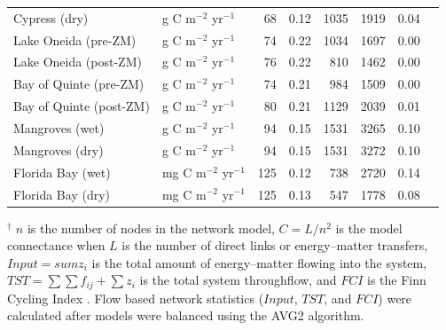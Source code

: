 \documentclass[article]{jss}
\begin{document}
\begin{table}[ht]
\begin{center}
\begin{tiny}
\begin{tabular}{llrrrrrr}
      Cypress (dry) & g C m$^{-2}$ yr$^{-1}$  &  68 & 0.12 & 1035 & 1919 & 0.04 &  \citet{ulanowicz97_cypress} \\
      Lake Oneida (pre-ZM) & g C m$^{-2}$ yr$^{-1}$  &  74 & 0.22 & 1034 & 1697 & 0.00 &  \citet{miehls09_oneida} \\
      Lake Oneida (post-ZM) & g C m$^{-2}$ yr$^{-1}$  &  76 & 0.22 & 810 & 1462 & 0.00 &  \citet{miehls09_oneida} \\
      Bay of Quinte (pre-ZM) & g C m$^{-2}$ yr$^{-1}$  &  74 & 0.21 & 984 & 1509 & 0.00 &   \citet{miehls09_quinte} \\
      Bay of Quinte (post-ZM) & g C m$^{-2}$ yr$^{-1}$  &  80 & 0.21 & 1129 & 2039 & 0.01 &   \citet{miehls09_quinte} \\
      Mangroves (wet) & g C m$^{-2}$ yr$^{-1}$  &  94 & 0.15 & 1531 & 3265 & 0.10 &  \citet{ulanowicz99_mangrove} \\
      Mangroves (dry) & g C m$^{-2}$ yr$^{-1}$  &  94 & 0.15 & 1531 & 3272 & 0.10 &  \citet{ulanowicz99_mangrove} \\
      Florida Bay (wet) & mg C m$^{-2}$ yr$^{-1}$  & 125 & 0.12 & 738 & 2720 & 0.14 &  \citet{ulanowicz98_fb} \\
      Florida Bay (dry) & mg C m$^{-2}$ yr$^{-1}$  & 125 & 0.13 & 547 & 1778 & 0.08 &  \citet{ulanowicz98_fb} \\
      \hline
\end{tabular}
\end{tiny}
\end{center}
\begin{scriptsize}
  $^\dagger$ $n$ is the number of nodes in the network model,
  $C=L/n^2$ is the model connectance when $L$ is the number of direct
  links or energy--matter transfers, $Input =sum{z_i}$ is the total
  amount of energy--matter flowing into the system,
  $TST=\sum\sum{f_{ij}}+\sum{z_i}$ is the total system throughflow,
  and $FCI$ is the Finn Cycling Index \citep{finn80}. Flow based
  network statistics ($Input$, $TST$, and $FCI$) were calculated after
  models were balanced using the AVG2 algorithm.
\end{scriptsize}
\end{table}
\end{document}
